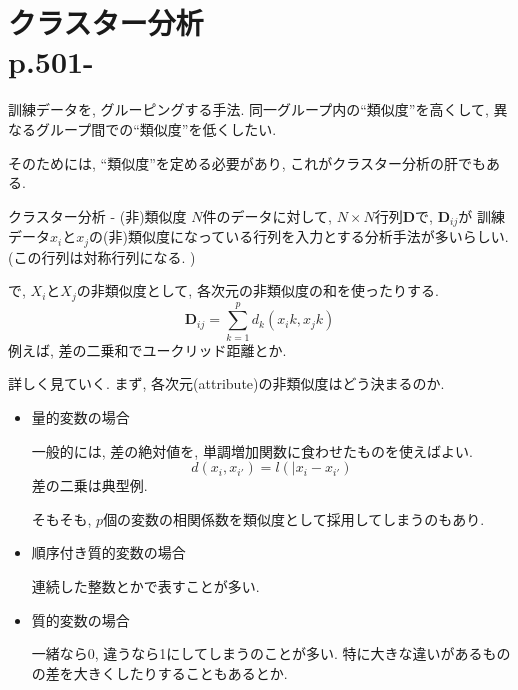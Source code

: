 \documentclass[dvipdfmx,8pt]{beamer}
\begin{document}
  \section{クラスター分析\\p.501-}
  \begin{frame}
    訓練データを, グルーピングする手法.
    同一グループ内の``類似度''を高くして, 異なるグループ間での``類似度''を低くしたい.

    そのためには, ``類似度''を定める必要があり, これがクラスター分析の肝でもある.
  \end{frame}
  \begin{frame}{クラスター分析 - (非)類似度}
    $N$件のデータに対して, $N \times N$行列$\textbf{D}$で, $\textbf{D}_{ij}$が
    訓練データ$x_i$と$x_j$の(非)類似度になっている行列を入力とする分析手法が多いらしい.
    (この行列は対称行列になる. )

    で, $X_i$と$X_j$の非類似度として, 各次元の非類似度の和を使ったりする.
    \[
      \textbf{D}_{ij}=\sum_{k=1}^pd_k(x_ik, x_jk)
    \]
    例えば, 差の二乗和でユークリッド距離とか.

    詳しく見ていく. まず, 各次元(attribute)の非類似度はどう決まるのか.

    \begin{itemize}
      \item 量的変数の場合

      一般的には, 差の絶対値を, 単調増加関数に食わせたものを使えばよい.
      \[
        d(x_i, x_{i'})=l(|x_i-x_{i'})
      \]
      差の二乗は典型例.

      そもそも, $p$個の変数の相関係数を類似度として採用してしまうのもあり.
      \item 順序付き質的変数の場合

      連続した整数とかで表すことが多い.

      \item 質的変数の場合

      一緒なら0, 違うなら1にしてしまうのことが多い.
      特に大きな違いがあるものの差を大きくしたりすることもあるとか.

    \end{itemize}
  \end{frame}
\end{document}
